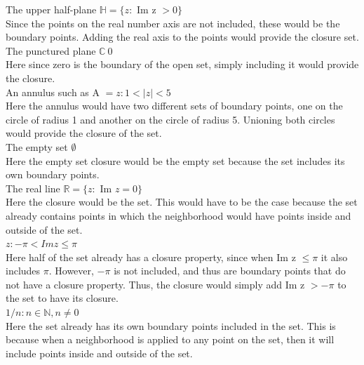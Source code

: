 \documentclass[12pt]{article}
\begin{document}
 The upper half-plane $\mathbb{H} = \{z:$ Im z $ > 0\}$\\

Since the points on the real number axis are not included, these would be the boundary points. 
Adding the real axis to the points would provide the closure set.\\

 The punctured plane $\mathbb{C}\ {0}$ \\

Here since zero is the boundary of the open set, simply including it would provide the closure.\\

 An annulus such as A $ = {z: 1 < |z| < 5}$\\

Here the annulus would have two different sets of boundary points, one on the circle of radius 1 and another on the circle of radius 5.
Unioning both circles would provide the closure of the set.\\

 The empty set $\emptyset$ \\

Here the empty set closure would be the empty set because the set includes its own boundary points.\\

 The real line $\mathbb{R} = \{z: $ Im $z = 0\}$\\

Here the closure would be the set.
This would have to be the case because the set already contains points in which the neighborhood would have points inside and outside of the set.\\

 ${z: -\pi < Im z \leq \pi}$\\

Here half of the set already has a closure property, since when Im z $ \leq \pi$ it also includes $\pi$. 
However, $-\pi$ is not included, and thus are boundary points that do not have a closure property. 
Thus, the closure would simply add Im z $> -\pi$ to the set to have its closure.\\

 ${1/n: n \in \mathbb{N}, n \neq 0}$\\

Here the set already has its own boundary points included in the set.
This is because when a neighborhood is applied to any point on the set, then it will include points inside and outside of the set.\\
\end{document}
